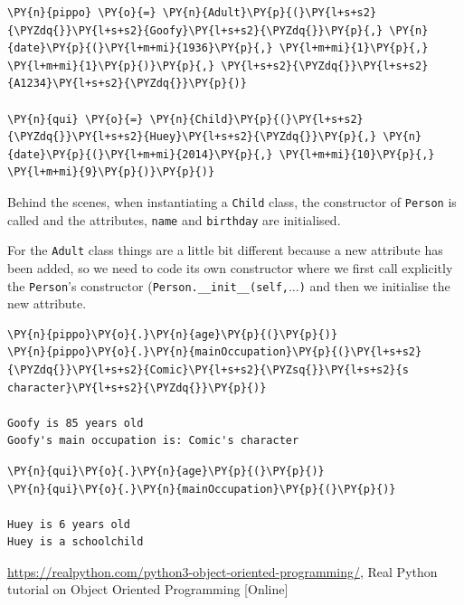 \begin{tcolorbox}[breakable, size=fbox, boxrule=1pt, pad at break*=1mm,colback=cellbackground, colframe=cellborder]
\begin{Verbatim}[commandchars=\\\{\}]
\PY{n}{pippo} \PY{o}{=} \PY{n}{Adult}\PY{p}{(}\PY{l+s+s2}{\PYZdq{}}\PY{l+s+s2}{Goofy}\PY{l+s+s2}{\PYZdq{}}\PY{p}{,} \PY{n}{date}\PY{p}{(}\PY{l+m+mi}{1936}\PY{p}{,} \PY{l+m+mi}{1}\PY{p}{,} \PY{l+m+mi}{1}\PY{p}{)}\PY{p}{,} \PY{l+s+s2}{\PYZdq{}}\PY{l+s+s2}{A1234}\PY{l+s+s2}{\PYZdq{}}\PY{p}{)}

\PY{n}{qui} \PY{o}{=} \PY{n}{Child}\PY{p}{(}\PY{l+s+s2}{\PYZdq{}}\PY{l+s+s2}{Huey}\PY{l+s+s2}{\PYZdq{}}\PY{p}{,} \PY{n}{date}\PY{p}{(}\PY{l+m+mi}{2014}\PY{p}{,} \PY{l+m+mi}{10}\PY{p}{,} \PY{l+m+mi}{9}\PY{p}{)}\PY{p}{)}
\end{Verbatim}
\end{tcolorbox}

Behind the scenes, when instantiating a \texttt{Child} class, the constructor of \texttt{Person} is called and the attributes, \texttt{name} and \texttt{birthday} are initialised.  

For the \texttt{Adult} class things are a little bit different because a new attribute has been added, so we need to code its own constructor where we first call explicitly the \texttt{Person}'s constructor (\texttt{Person.\_\_init\_\_(self,$\ldots$)} and then we initialise the new attribute.

\begin{tcolorbox}[breakable, size=fbox, boxrule=1pt, pad at break*=1mm,colback=cellbackground, colframe=cellborder]
\begin{Verbatim}[commandchars=\\\{\}]
\PY{n}{pippo}\PY{o}{.}\PY{n}{age}\PY{p}{(}\PY{p}{)}
\PY{n}{pippo}\PY{o}{.}\PY{n}{mainOccupation}\PY{p}{(}\PY{l+s+s2}{\PYZdq{}}\PY{l+s+s2}{Comic}\PY{l+s+s2}{\PYZsq{}}\PY{l+s+s2}{s character}\PY{l+s+s2}{\PYZdq{}}\PY{p}{)}

Goofy is 85 years old
Goofy's main occupation is: Comic's character
\end{Verbatim}
\end{tcolorbox}

\begin{tcolorbox}[breakable, size=fbox, boxrule=1pt, pad at break*=1mm,colback=cellbackground, colframe=cellborder]
\begin{Verbatim}[commandchars=\\\{\}]
\PY{n}{qui}\PY{o}{.}\PY{n}{age}\PY{p}{(}\PY{p}{)}
\PY{n}{qui}\PY{o}{.}\PY{n}{mainOccupation}\PY{p}{(}\PY{p}{)}

Huey is 6 years old
Huey is a schoolchild
\end{Verbatim}
\end{tcolorbox}

\begin{thebibliography}{9}
 \href{https://realpython.com/python3-object-oriented-programming/}{https://realpython.com/python3-object-oriented-programming/}, Real Python tutorial on Object Oriented Programming [Online]
\end{thebibliography}
